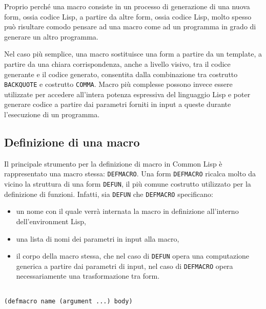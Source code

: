 Proprio perché una macro consiste in un processo di generazione di una nuova
form, ossia codice Lisp, a partire da altre form, ossia codice Lisp, molto
spesso può risultare comodo pensare ad una macro come ad un programma in grado
di generare un altro programma.

Nel caso più semplice, una macro sostituisce una form a partire da un
template, a partire da una chiara corrispondenza, anche a livello visivo, tra
il codice generante e il codice generato, consentita dalla combinazione tra
costrutto \texttt{BACKQUOTE} e costrutto \texttt{COMMA}. Macro più complesse
possono invece essere utilizzate per accedere all’intera potenza espressiva
del linguaggio Lisp e poter generare codice a partire dai parametri forniti in
input a queste durante l’esecuzione di un programma.\\

\subsection{Definizione di una macro}

Il principale strumento per la definizione di macro in Common Lisp è
rappresentato una macro stessa: \texttt{DEFMACRO}. Una form \texttt{DEFMACRO}
ricalca molto da vicino la struttura di una form \texttt{DEFUN}, il più comune
costrutto utilizzato per la definizione di funzioni. Infatti, sia
\texttt{DEFUN} che \texttt{DEFMACRO} specificano:

\begin{itemize}

\item un nome con il quale verrà internata la macro in definizione all’interno
dell’environment Lisp,

\item una lista di nomi dei parametri in input alla macro,

\item il corpo della macro stessa, che nel caso di \texttt{DEFUN} opera una
computazione generica a partire dai parametri di input, nel caso di
\texttt{DEFMACRO} opera necessariamente una trasformazione tra form.

\end{itemize}

\begin{lstlisting}[caption=Signature della macro DEFMACRO]

(defmacro name (argument ...) body)

\end{lstlisting}

